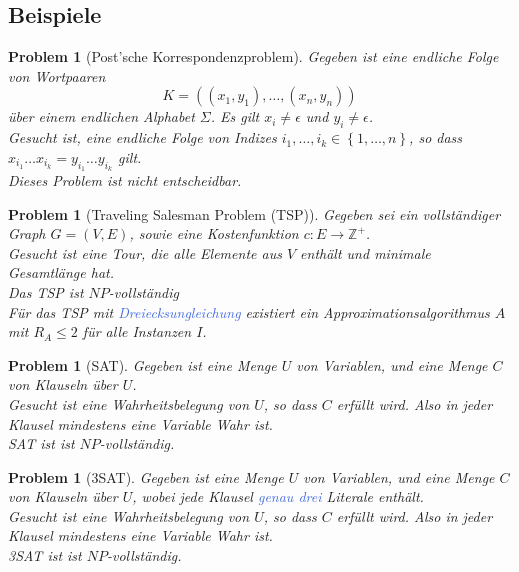 \documentclass[11pt]{article}
\newcommand{\tcol}[1]{\textcolor{RoyalBlue}{#1}}
\newcommand{\set}[1]{\left\lbrace #1\right\rbrace}
\theoremstyle{break}
\newtheorem{prob}[satz]{Problem}
\begin{document}
\subsection{Beispiele}

\begin{prob}[Post'sche Korrespondenzproblem]
Gegeben ist eine endliche Folge von Wortpaaren
\[K=((x_1,y_1),\dots,(x_n,y_n))\]
über einem endlichen Alphabet $\Sigma$. Es gilt $x_i\neq\epsilon$ und $y_i\neq\epsilon$.\\
Gesucht ist, eine endliche Folge von Indizes $i_1,\dots,i_k\in\set{1,\dots,n}$, so dass $x_{i_1}\dots x_{i_k}=y_{i_1}\dots y_{i_k}$ gilt.\\
Dieses Problem ist nicht entscheidbar.
\end{prob}

\begin{prob}[Traveling Salesman Problem (TSP)]
Gegeben sei ein vollständiger Graph $G=(V,E)$, sowie eine Kostenfunktion $c\colon E\to\mathbb{Z}^+$.\\
Gesucht ist eine Tour, die alle Elemente aus $V$ enthält und minimale Gesamtlänge hat.\\
Das TSP ist $NP$-vollständig\\
Für das TSP mit \tcol{Dreiecksungleichung} existiert ein Approximationsalgorithmus $A$ mit $R_A\leq 2$ für alle Instanzen $I$.
\end{prob}

\begin{prob}[SAT]
Gegeben ist eine Menge $U$ von Variablen, und eine Menge $C$ von Klauseln über $U$.\\
Gesucht ist eine Wahrheitsbelegung von $U$, so dass $C$ erfüllt wird. Also in jeder Klausel mindestens eine Variable Wahr ist.\\
SAT ist ist $NP$-vollständig.
\end{prob}

\begin{prob}[3SAT]
Gegeben ist eine Menge $U$ von Variablen, und eine Menge $C$ von Klauseln über $U$, wobei jede Klausel \tcol{genau drei} Literale enthält.\\
Gesucht ist eine Wahrheitsbelegung von $U$, so dass $C$ erfüllt wird. Also in jeder Klausel mindestens eine Variable Wahr ist.\\
3SAT ist ist $NP$-vollständig.
\end{prob}
\end{document}
